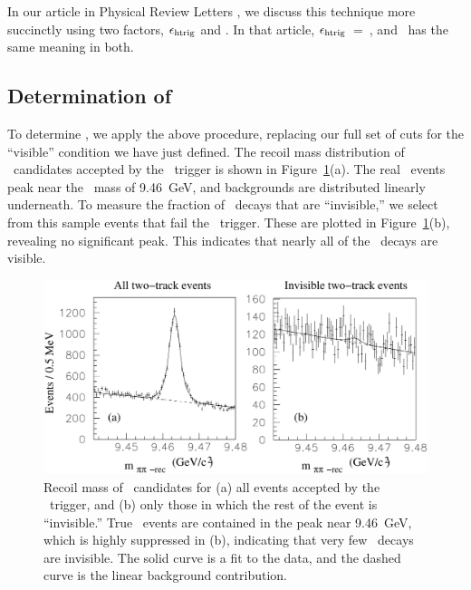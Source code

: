 \documentclass{cornell}
\begin{document}
In our article in Physical Review Letters \cite{me}, we discuss this
technique more succinctly using two factors, $\epsilon_{\mbox{\scriptsize htrig}}$
and \ecuts.  In that article, $\epsilon_{\mbox{\scriptsize htrig}}$~=~\evis,
and \ecuts\ has the same meaning in both.

\subsection{Determination of \boldmath \evis}

To determine \evis, we apply the above procedure, replacing our full
set of cuts for the ``visible'' condition we have just defined.  The
recoil mass distribution of \pipi\ candidates accepted by the
\twotrack\ trigger is shown in Figure~\ref{pipitwotrack}(a).  The real
\twotoone\ events peak near the \us\ mass of 9.46~GeV, and backgrounds
are distributed linearly underneath.  To measure the fraction of \us\
decays that are ``invisible,'' we select from this sample events that
fail the \hadron\ trigger.  These are plotted in Figure~\ref{pipitwotrack}(b), revealing no significant peak.  This indicates
that nearly all of the \us\ decays are visible.

\begin{figure}[p]
  \begin{center}
    \includegraphics[width=\linewidth]{newplots/pipitwotrack}
  \end{center}
  \caption[\pipi\ recoil mass for events from the \twotrack\
  trigger]{\label{pipitwotrack} Recoil mass of \pipi\ candidates for
  (a) all events accepted by the \twotrack\ trigger, and (b) only
  those in which the rest of the event is ``invisible.''  True
  \twotoone\ events are contained in the peak near 9.46~GeV, which is
  highly suppressed in (b), indicating that very few \us\ decays are
  invisible.  The solid curve is a fit to the data, and the dashed
  curve is the linear background contribution.}
\end{figure}
\end{document}
